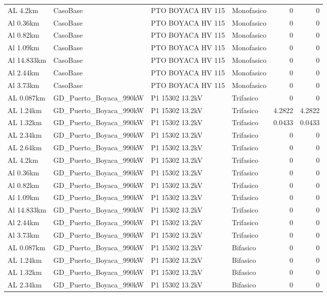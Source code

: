 \documentclass[11pt,a4paper]{article}
\begin{document}
\begin{longtable}{llllrr}
AL 4.2km & CasoBase & PTO BOYACA HV 115 & Monofasico & 0 & 0 \\
Al 0.36km & CasoBase & PTO BOYACA HV 115 & Monofasico & 0 & 0 \\
Al 0.82km & CasoBase & PTO BOYACA HV 115 & Monofasico & 0 & 0 \\
Al 1.09km & CasoBase & PTO BOYACA HV 115 & Monofasico & 0 & 0 \\
Al 14.833km & CasoBase & PTO BOYACA HV 115 & Monofasico & 0 & 0 \\
Al 2.44km & CasoBase & PTO BOYACA HV 115 & Monofasico & 0 & 0 \\
Al 3.73km & CasoBase & PTO BOYACA HV 115 & Monofasico & 0 & 0 \\
AL 0.087km & GD\_Puerto\_Boyaca\_990kW & P1 15302 13.2kV & Trifasico & 0 & 0 \\
AL 1.24km & GD\_Puerto\_Boyaca\_990kW & P1 15302 13.2kV & Trifasico & 4.2822 & 4.2822 \\
AL 1.32km & GD\_Puerto\_Boyaca\_990kW & P1 15302 13.2kV & Trifasico & 0.0433 & 0.0433 \\
AL 2.34km & GD\_Puerto\_Boyaca\_990kW & P1 15302 13.2kV & Trifasico & 0 & 0 \\
AL 2.64km & GD\_Puerto\_Boyaca\_990kW & P1 15302 13.2kV & Trifasico & 0 & 0 \\
AL 4.2km & GD\_Puerto\_Boyaca\_990kW & P1 15302 13.2kV & Trifasico & 0 & 0 \\
Al 0.36km & GD\_Puerto\_Boyaca\_990kW & P1 15302 13.2kV & Trifasico & 0 & 0 \\
Al 0.82km & GD\_Puerto\_Boyaca\_990kW & P1 15302 13.2kV & Trifasico & 0 & 0 \\
Al 1.09km & GD\_Puerto\_Boyaca\_990kW & P1 15302 13.2kV & Trifasico & 0 & 0 \\
Al 14.833km & GD\_Puerto\_Boyaca\_990kW & P1 15302 13.2kV & Trifasico & 0 & 0 \\
Al 2.44km & GD\_Puerto\_Boyaca\_990kW & P1 15302 13.2kV & Trifasico & 0 & 0 \\
Al 3.73km & GD\_Puerto\_Boyaca\_990kW & P1 15302 13.2kV & Trifasico & 0 & 0 \\
AL 0.087km & GD\_Puerto\_Boyaca\_990kW & P1 15302 13.2kV & Bifasico & 0 & 0 \\
AL 1.24km & GD\_Puerto\_Boyaca\_990kW & P1 15302 13.2kV & Bifasico & 0 & 0 \\
AL 1.32km & GD\_Puerto\_Boyaca\_990kW & P1 15302 13.2kV & Bifasico & 0 & 0 \\
AL 2.34km & GD\_Puerto\_Boyaca\_990kW & P1 15302 13.2kV & Bifasico & 0 & 0 \\

\end{longtable}
\end{document}
